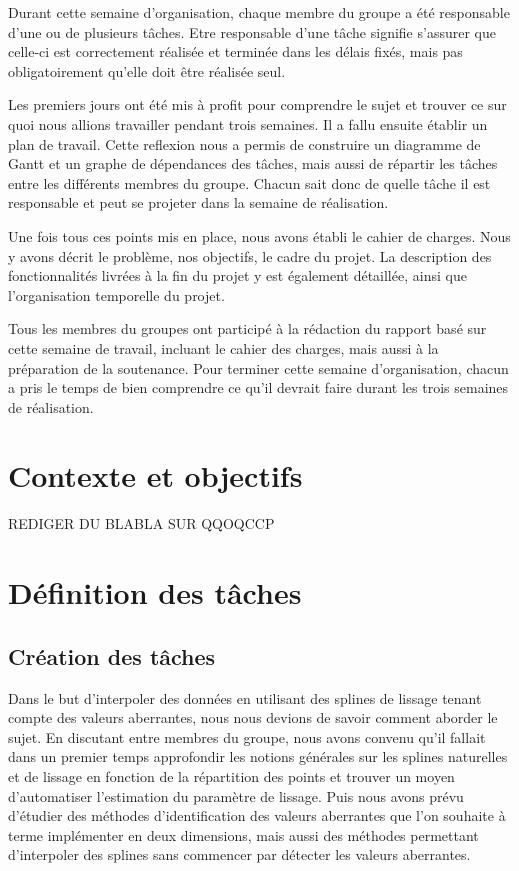 \documentclass[a4paper,12pt]{article} %
\begin{document}
Durant cette semaine d'organisation, chaque membre du groupe a été responsable d’une ou de plusieurs tâches. Etre responsable d'une tâche signifie s'assurer que celle-ci est correctement réalisée et terminée dans les délais fixés, mais pas obligatoirement qu'elle doit être réalisée seul.

Les premiers jours ont été mis à profit pour comprendre le sujet et trouver ce sur quoi nous allions travailler pendant trois semaines. Il a fallu ensuite établir un plan de travail. Cette reflexion nous a permis de construire un diagramme de Gantt et un graphe de dépendances des tâches, mais aussi de répartir les tâches entre les différents membres du groupe. Chacun sait donc de quelle tâche il est responsable et peut se projeter dans la semaine de réalisation.

Une fois tous ces points mis en place, nous avons établi le cahier de charges. Nous y avons décrit le problème, nos objectifs, le cadre du projet. La description des fonctionnalités livrées à la fin du projet y est également détaillée, ainsi que l'organisation temporelle du projet. 

Tous les membres du groupes ont participé à la rédaction du rapport basé sur cette semaine de travail, incluant le cahier des charges, mais aussi à la préparation de la soutenance. Pour terminer cette semaine d'organisation, chacun a pris le temps de bien comprendre ce qu'il devrait faire durant les trois semaines de réalisation. 
\newpage
\section{Contexte et objectifs}
	REDIGER DU BLABLA SUR QQOQCCP

\section{Définition des tâches}

	\subsection{Création des tâches}
	Dans le but d'interpoler des données en utilisant des splines de lissage tenant compte des valeurs aberrantes, nous nous devions de savoir comment aborder le sujet. En discutant entre membres du groupe, nous avons convenu qu'il fallait dans un premier temps approfondir les notions générales sur les splines naturelles et de lissage en fonction de la répartition des points et trouver un moyen d'automatiser l'estimation du paramètre de lissage. Puis nous avons prévu d'étudier des méthodes d'identification des valeurs aberrantes que l'on souhaite à terme implémenter en deux dimensions, mais aussi des méthodes permettant d'interpoler des splines sans commencer par détecter les valeurs aberrantes.
\newpage
\end{document}
